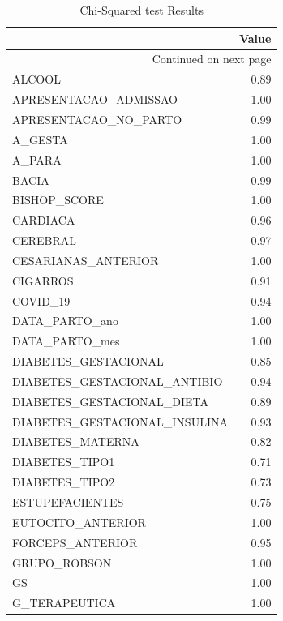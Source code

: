 \documentclass{article}
\begin{document}
\begin{longtable}{lr}
\caption{Chi-Squared test Results}\label{tab:cs}\\
\toprule
{} & Value \\
\midrule
\endhead
\midrule
\multicolumn{2}{r}{{Continued on next page}} \\
\midrule
\endfoot

\bottomrule
\endlastfoot
ALCOOL                        &  0.89 \\
APRESENTACAO\_ADMISSAO         &  1.00 \\
APRESENTACAO\_NO\_PARTO         &  0.99 \\
A\_GESTA                       &  1.00 \\
A\_PARA                        &  1.00 \\
BACIA                         &  0.99 \\
BISHOP\_SCORE                  &  1.00 \\
CARDIACA                      &  0.96 \\
CEREBRAL                      &  0.97 \\
CESARIANAS\_ANTERIOR           &  1.00 \\
CIGARROS                      &  0.91 \\
COVID\_19                      &  0.94 \\
DATA\_PARTO\_ano                &  1.00 \\
DATA\_PARTO\_mes                &  1.00 \\
DIABETES\_GESTACIONAL          &  0.85 \\
DIABETES\_GESTACIONAL\_ANTIBIO  &  0.94 \\
DIABETES\_GESTACIONAL\_DIETA    &  0.89 \\
DIABETES\_GESTACIONAL\_INSULINA &  0.93 \\
DIABETES\_MATERNA              &  0.82 \\
DIABETES\_TIPO1                &  0.71 \\
DIABETES\_TIPO2                &  0.73 \\
ESTUPEFACIENTES               &  0.75 \\
EUTOCITO\_ANTERIOR             &  1.00 \\
FORCEPS\_ANTERIOR              &  0.95 \\
GRUPO\_ROBSON                  &  1.00 \\
GS                            &  1.00 \\
G\_TERAPEUTICA                 &  1.00 \\

\end{longtable}
\end{document}
